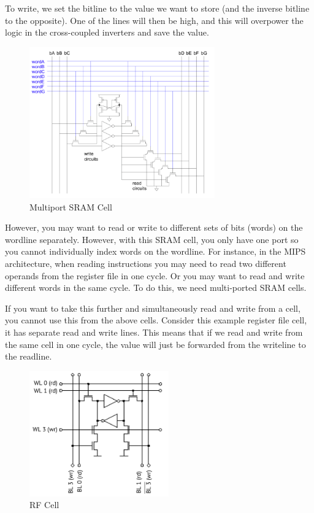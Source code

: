 \documentclass{article}
\begin{document}
To write, we set the bitline to the value we want to store (and the inverse bitline to the opposite). One of the lines will then be high, and this will overpower the logic in the cross-coupled inverters and save the value.

\begin{figure}[ht!]
\centering
\includegraphics[width=80mm]{img/Multiport.png}
\caption{Multiport SRAM Cell}
\end{figure}

However, you may want to read or write to different sets of bits (words) on the wordline separately. However, with this SRAM cell, you only have one port so you cannot individually index words on the wordline. For instance, in the MIPS architecture, when reading instructions you may need to read two different operands from the register file in one cycle. Or you may want to read and write different words in the same cycle. To do this, we need multi-ported SRAM cells.

If you want to take this further and simultaneously read and write from a cell, you cannot use this from the above cells. Consider this example register file cell, it has separate read and write lines. This means that if we read and write from the same cell in one cycle, the value will just be forwarded from the writeline to the readline. 

\begin{figure}[ht!]
\centering
\includegraphics[width=60mm]{img/RF.png}
\caption{RF Cell}
\end{figure}
\end{document}
